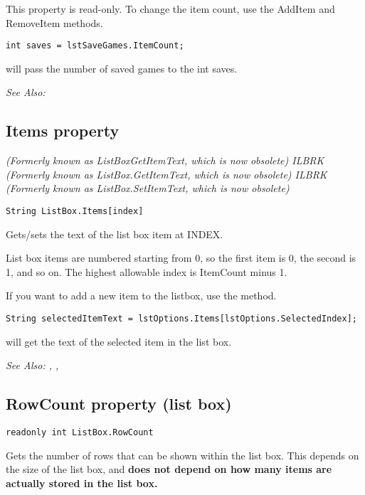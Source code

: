 This property is read-only. To change the item count, use the AddItem and RemoveItem methods.

\begin{verbatim}
int saves = lstSaveGames.ItemCount;
\end{verbatim}
will pass the number of saved games to the int saves.

\it{See Also:} 


\subsection{Items property}\label{ListBox.Items}%

\it{(Formerly known as ListBoxGetItemText, which is now obsolete)} ILBRK
\it{(Formerly known as ListBox.GetItemText, which is now obsolete)} ILBRK
\it{(Formerly known as ListBox.SetItemText, which is now obsolete)}

\begin{verbatim}
String ListBox.Items[index]
\end{verbatim}
Gets/sets the text of the list box item at INDEX.

List box items are numbered starting from 0, so the first item is 0, the
second is 1, and so on. The highest allowable index is ItemCount minus 1.

If you want to add a new item to the listbox, use the  method.

\begin{verbatim}
String selectedItemText = lstOptions.Items[lstOptions.SelectedIndex];
\end{verbatim}
will get the text of the selected item in the list box.

\it{See Also:} ,
,


\subsection{RowCount property (list box)}\label{ListBox.RowCount}%

\begin{verbatim}
readonly int ListBox.RowCount
\end{verbatim}
Gets the number of rows that can be shown within the list box. This depends on the size of
the list box, and \bf{does not} depend on how many items are actually stored in the list box.

